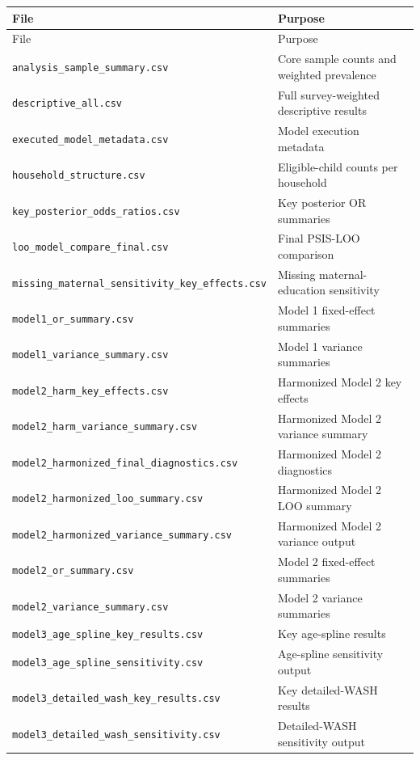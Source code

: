 \scriptsize
\begin{longtable}{p{}p{}}
\toprule
File & Purpose \\
\midrule
\endfirsthead
\toprule
File & Purpose \\
\midrule
\endhead
\texttt{analysis\_sample\_summary.csv} & Core sample counts and weighted prevalence \\
\texttt{descriptive\_all.csv} & Full survey-weighted descriptive results \\
\texttt{executed\_model\_metadata.csv} & Model execution metadata \\
\texttt{household\_structure.csv} & Eligible-child counts per household \\
\texttt{key\_posterior\_odds\_ratios.csv} & Key posterior OR summaries \\
\texttt{loo\_model\_compare\_final.csv} & Final PSIS-LOO comparison \\
\texttt{missing\_maternal\_sensitivity\_key\_effects.csv} & Missing maternal-education sensitivity \\
\texttt{model1\_or\_summary.csv} & Model 1 fixed-effect summaries \\
\texttt{model1\_variance\_summary.csv} & Model 1 variance summaries \\
\texttt{model2\_harm\_key\_effects.csv} & Harmonized Model 2 key effects \\
\texttt{model2\_harm\_variance\_summary.csv} & Harmonized Model 2 variance summary \\
\texttt{model2\_harmonized\_final\_diagnostics.csv} & Harmonized Model 2 diagnostics \\
\texttt{model2\_harmonized\_loo\_summary.csv} & Harmonized Model 2 LOO summary \\
\texttt{model2\_harmonized\_variance\_summary.csv} & Harmonized Model 2 variance output \\
\texttt{model2\_or\_summary.csv} & Model 2 fixed-effect summaries \\
\texttt{model2\_variance\_summary.csv} & Model 2 variance summaries \\
\texttt{model3\_age\_spline\_key\_results.csv} & Key age-spline results \\
\texttt{model3\_age\_spline\_sensitivity.csv} & Age-spline sensitivity output \\
\texttt{model3\_detailed\_wash\_key\_results.csv} & Key detailed-WASH results \\
\texttt{model3\_detailed\_wash\_sensitivity.csv} & Detailed-WASH sensitivity output \\

\end{longtable}
